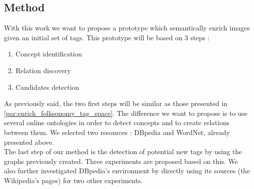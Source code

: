 \subsection{Method} %
\label{sub:method}
With this work we want to propose a prototype which semantically enrich images given an initial set of tags. This prototype will be based on 3 steps :
\begin{enumerate}
	\item Concept identification
	\item Relation discovery
	\item Candidates detection
\end{enumerate}
As previously said, the two first steps will be similar as those presented in \ref{par:enrich_folksonomy_tag_space}. The difference we want to propose is to use several online ontologies in order to detect concepts and to create relations between them. We selected two resources : DBpedia and WordNet, already presented above.\\
The last step of our method is the detection of potential new tags by using the graphs previously created. Three experiments are proposed based on this. We also further investigated DBpedia's environment by directly using its sources (the Wikipedia's pages) for two other experiments.
